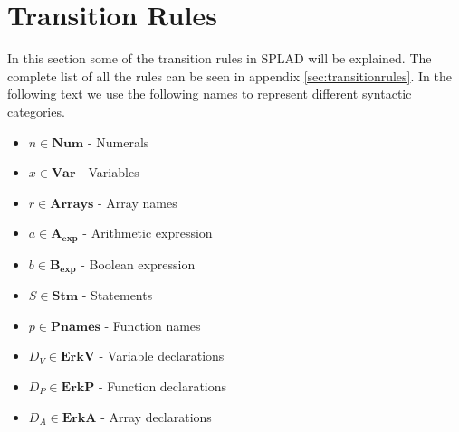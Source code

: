 

\section{Transition Rules}
In this section some of the transition rules in SPLAD will be explained. The complete list of all the rules can be seen in appendix \ref{sec:transitionrules}.
In the following text we use the following names to represent different syntactic categories.
\begin{itemize}
\item $n \in \textbf{Num}$ - Numerals
\item $x \in \textbf{Var}$ - Variables 
\item $r \in \textbf{Arrays}$ - Array names
\item $a \in \mathbf{A_{exp}}$ - Arithmetic expression
\item $b \in \mathbf{B_{exp}}$ - Boolean expression
\item $S \in \textbf{Stm}$ - Statements
\item $p \in \textbf{Pnames}$ - Function names
\item $D_V \in \textbf{ErkV}$ - Variable declarations
\item $D_P \in \textbf{ErkP}$ - Function declarations
\item $D_A \in \textbf{ErkA}$ - Array declarations
\end{itemize}

